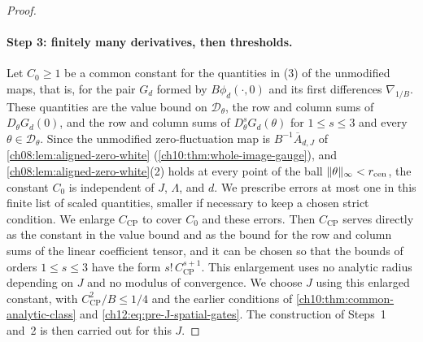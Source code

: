 \begin{proof}
\paragraph{Step 3: finitely many derivatives, then thresholds.}
Let $C_0\ge1$ be a common constant for the quantities in (3) of the unmodified maps, that is, for the pair $G_d$ formed by $B\phi_d(\cdot,0)$ and its first differences $\nabla_{1/B}$. These quantities are the value bound on $\mathscr D_\theta$, the row and column sums of $D_\theta G_d(0)$, and the row and column sums of $D_\theta^sG_d(\theta)$ for $1\le s\le3$ and every $\theta\in\mathscr D_\theta$. Since the unmodified zero-fluctuation map is $B^{-1}\overline A_{d,J}$ of \cref{ch08:lem:aligned-zero-white} (\cref{ch10:thm:whole-image-gauge}), and \cref{ch08:lem:aligned-zero-white}(2) holds at every point of the ball $\lVert \theta\rVert_\infty<r_{\mathrm{cen}}$, the constant $C_0$ is independent of $J$, $\Lambda$, and $d$. We prescribe errors at most one in this finite list of scaled quantities, smaller if necessary to keep a chosen strict condition. We enlarge $C_{\mathrm{CP}}$ to cover $C_0$ and these errors. Then $C_{\mathrm{CP}}$ serves directly as the constant in the value bound and as the bound for the row and column sums of the linear coefficient tensor, and it can be chosen so that the bounds of orders $1\le s\le3$ have the form $s!\,C_{\mathrm{CP}}^{s+1}$. This enlargement uses no analytic radius depending on $J$ and no modulus of convergence. We choose $J$ using this enlarged constant, with $C_{\mathrm{CP}}^2/B\le1/4$ and the earlier conditions of \cref{ch10:thm:common-analytic-class} and \eqref{ch12:eq:pre-J-spatial-gates}. The construction of Steps~1 and~2 is then carried out for this $J$.


\end{proof}
